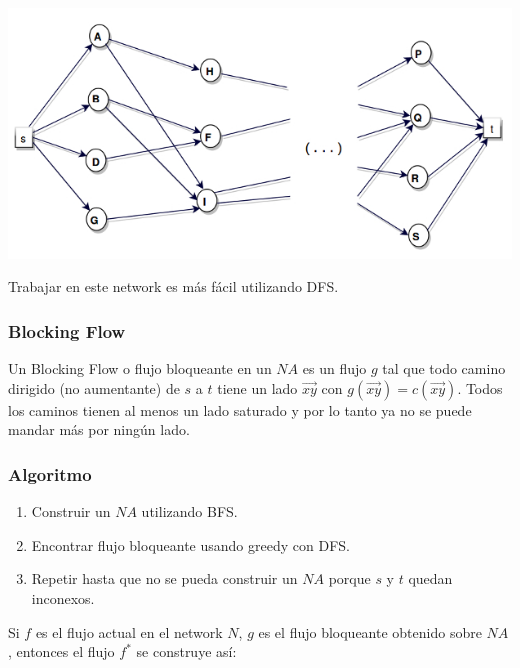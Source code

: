 \documentclass[10pt,a4paper]{article}
\begin{document}
\begin{center}

    \begin{adjustbox}{max size={\textwidth}{\textheight}}
        \includegraphics{definitions/dinic_1.jpg}
        \end{adjustbox}
    
\end{center}

Trabajar en este network es más fácil utilizando DFS.

\subsubsection*{Blocking Flow}

Un Blocking Flow o flujo bloqueante en un $NA$ es un flujo $g$ tal que todo camino dirigido (no aumentante) de $s$ a $t$ tiene un lado $\overrightarrow{xy}$ con $g(\overrightarrow{xy}) = c(\overrightarrow{xy})$. Todos los caminos tienen al menos un lado saturado y por lo tanto ya no se puede mandar más por ningún lado.

\subsubsection*{Algoritmo}

\begin{enumerate}

	\item Construir un $NA$ utilizando BFS.
	\item Encontrar flujo bloqueante usando greedy con DFS.
	\item Repetir hasta que no se pueda construir un $NA$ porque $s$ y $t$ quedan inconexos.
\end{enumerate}

Si $f$ es el flujo actual en el network $N$, $g$ es el flujo bloqueante obtenido sobre $NA$, entonces el flujo $f^*$ se construye así:
\end{document}
